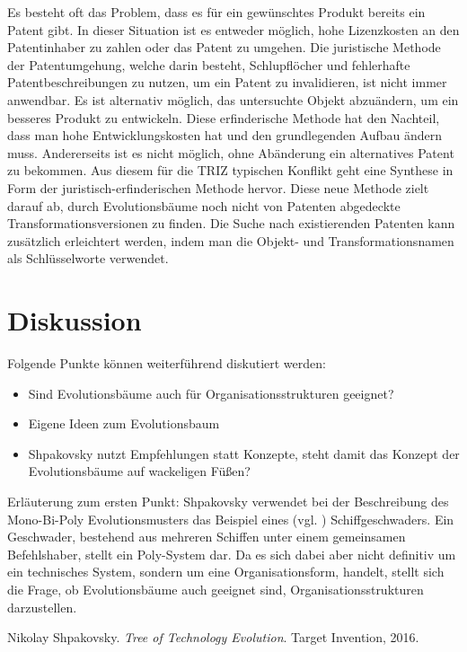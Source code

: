 \documentclass[11pt,a4paper]{article}
\begin{document}
Es besteht oft das Problem, dass es für ein gewünschtes Produkt bereits ein
Patent gibt. In dieser Situation ist es entweder möglich, hohe Lizenzkosten an
den Patentinhaber zu zahlen oder das Patent zu umgehen.  Die juristische
Methode der Patentumgehung, welche darin besteht, Schlupflöcher und
fehlerhafte Patentbeschreibungen zu nutzen, um ein Patent zu invalidieren, ist
nicht immer anwendbar.  Es ist alternativ möglich, das untersuchte Objekt
abzuändern, um ein besseres Produkt zu entwickeln. Diese erfinderische Methode
hat den Nachteil, dass man hohe Entwicklungskosten hat und den grundlegenden
Aufbau ändern muss. Andererseits ist es nicht möglich, ohne Abänderung ein
alternatives Patent zu bekommen.  Aus diesem für die TRIZ typischen Konflikt
geht eine Synthese in Form der juristisch-erfinderischen Methode hervor. Diese
neue Methode zielt darauf ab, durch Evolutionsbäume noch nicht von Patenten
abgedeckte Transformationsversionen zu finden.  Die Suche nach existierenden
Patenten kann zusätzlich erleichtert werden, indem man die Objekt- und
Transformationsnamen als Schlüsselworte verwendet.

\section{Diskussion}

Folgende Punkte können weiterführend diskutiert werden:
\begin{itemize}[noitemsep]
\item Sind Evolutionsbäume auch für Organisationsstrukturen geeignet?
\item Eigene Ideen zum Evolutionsbaum
\item Shpakovsky nutzt Empfehlungen statt Konzepte, steht damit das Konzept
  der Evolutionsbäume auf wackeligen Füßen?
\end{itemize}

Erläuterung zum ersten Punkt: Shpakovsky verwendet bei der Beschreibung des
Mono-Bi-Poly Evolutionsmusters das Beispiel eines (vgl. \cite[S. 77]{evo})
Schiffgeschwaders. Ein Geschwader, bestehend aus mehreren Schiffen unter einem
gemeinsamen Befehlshaber, stellt ein Poly-System dar. Da es sich dabei aber
nicht definitiv um ein technisches System, sondern um eine Organisationsform,
handelt, stellt sich die Frage, ob Evolutionsbäume auch geeignet sind, 
Organisationsstrukturen darzustellen.



\begin{thebibliography}{xx}
 Nikolay Shpakovsky. \emph{Tree of Technology Evolution}. Target
  Invention, 2016.
\end{thebibliography}
\end{document}
